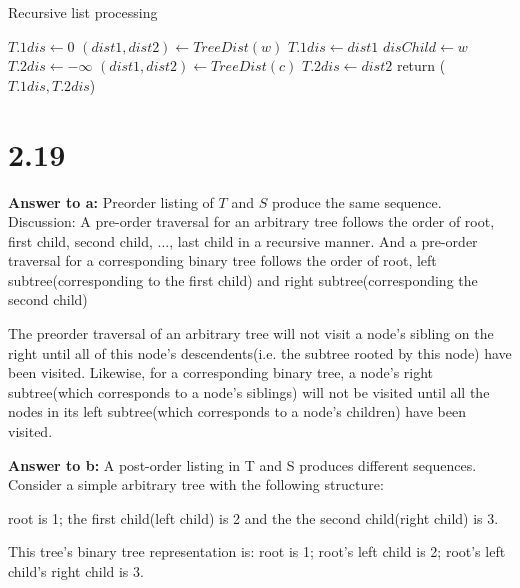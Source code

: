 \documentclass[a4paper,11pt]{article}
\theoremstyle{mytheor}
\begin{document}
\begin{algorithm}[H]
\caption{Recursive list processing}\label{sec:TREEEVALUATION_2_10}
\begin{algorithmic}[1]
  \State $T.1dis \gets 0$
    \State $(dist1, dist2) \gets TreeDist(w)$ 
      \State $T.1dis \gets dist1$
      \State $disChild \gets w$
    \EndIf
  \EndFor
  \State $T.2dis \gets -\infty$
    \State $(dist1, dist2) \gets TreeDist(c)$
      \State $T.2dis \gets dist2$
    \EndIf
  \EndFor
  \State return ($T.1dis, T.2dis$)
\EndFunction
\end{algorithmic}
\end{algorithm}

\vspace{1.2in}

\section*{2.19}
\noindent\textbf{Answer to a:} Preorder listing of $T$ and $S$ produce the same sequence.\\
Discussion: A pre-order traversal for an arbitrary tree follows the order of root, first child, second child, ..., last child in a recursive manner. And a pre-order traversal for a corresponding binary tree follows the order of root, left subtree(corresponding to the first child) and right subtree(corresponding the second child)

The preorder traversal of an arbitrary tree will not visit a node's sibling on the right until all of this node's descendents(i.e. the subtree rooted by this node) have been visited. Likewise, for a corresponding binary tree, a node's right subtree(which corresponds to a node's siblings) will not be visited until all the nodes in its left subtree(which corresponds to a node's children) have been visited.

\vspace{1.2in}

\noindent\textbf{Answer to b:} A post-order listing in T and S produces different sequences. Consider a simple arbitrary tree with the following structure:

root is 1; the first child(left child) is 2 and the the second child(right child) is 3.

This tree's binary tree representation is: root is 1; root's left child is 2; root's left child's right child is 3.
\end{document}
